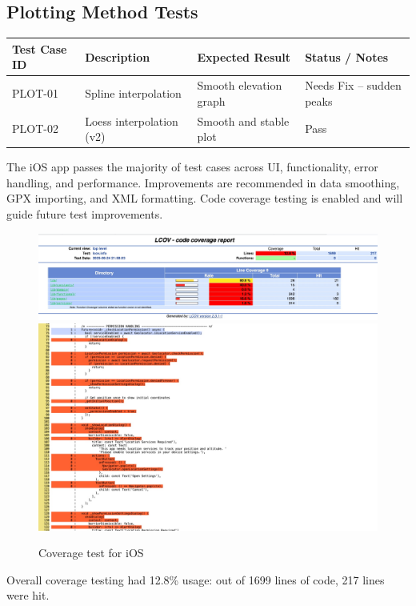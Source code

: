 \documentclass[12pt]{article}
\begin{document}
\subsection{Plotting Method Tests}
\begin{longtable}{|p{2.2cm}|p{5.2cm}|p{4cm}|p{2.5cm}|}
\hline
\textbf{Test Case ID} & \textbf{Description} & \textbf{Expected Result} & \textbf{Status / Notes} \\
\hline
PLOT-01 & Spline interpolation & Smooth elevation graph & Needs Fix – sudden peaks \\
\hline
PLOT-02 & Loess interpolation (v2) & Smooth and stable plot & Pass \\
\hline
\end{longtable}

The iOS app passes the majority of test cases across UI, functionality, error handling, and performance. Improvements are recommended in data smoothing, GPX importing, and XML formatting. Code coverage testing is enabled and will guide future test improvements.

\begin{figure}[h!]
    \centering
    \includegraphics[width=1\textwidth]{Project_Screenshots/coverage1.jpg}
    \includegraphics[width=1.5\textwidth]{Project_Screenshots/coverage2.jpg}
    \caption{Coverage test for iOS}
\end{figure}

\vspace{0.5em}
\noindent Overall coverage testing had 12.8\% usage: out of 1699 lines of code, 217 lines were hit.
\end{document}
